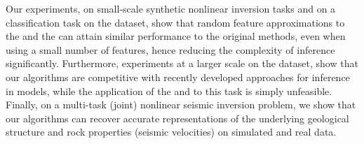 Our experiments, on small-scale synthetic nonlinear inversion tasks and on 
a classification task on the \usps dataset, show that random feature approximations to the 
\egp and the \ugp can attain similar performance to the original methods, 
even when using a small number of features, hence reducing the complexity 
of inference significantly. Furthermore, experiments at a larger scale on 
the \mnist dataset, show that our algorithms are competitive with recently developed 
approaches for inference in \gp models, while the application of the \egp and \ugp to
this task is simply unfeasible. Finally, on a multi-task (joint) nonlinear seismic inversion  problem,
we show that our algorithms can recover accurate representations of the underlying 
geological structure and rock properties (seismic velocities) on simulated and real data.



 



 






